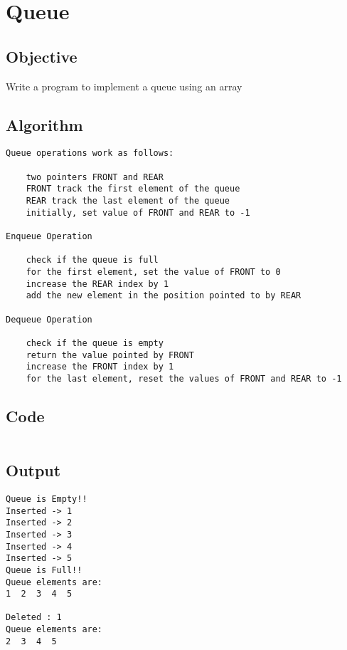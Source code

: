 \section{Queue}
\label{sec:Queue}

\subsection{Objective}
Write a program to implement a queue using an array

\subsection{Algorithm}
\begin{lstlisting}[style=mystyle]
Queue operations work as follows:

    two pointers FRONT and REAR
    FRONT track the first element of the queue
    REAR track the last element of the queue
    initially, set value of FRONT and REAR to -1

Enqueue Operation

    check if the queue is full
    for the first element, set the value of FRONT to 0
    increase the REAR index by 1
    add the new element in the position pointed to by REAR

Dequeue Operation

    check if the queue is empty
    return the value pointed by FRONT
    increase the FRONT index by 1
    for the last element, reset the values of FRONT and REAR to -1
\end{lstlisting}

\subsection{Code}
\inputminted[]{c}{../../Code/queue.c}

\subsection{Output}
\begin{lstlisting}[style=output]
Queue is Empty!!
Inserted -> 1
Inserted -> 2
Inserted -> 3
Inserted -> 4
Inserted -> 5
Queue is Full!!
Queue elements are:
1  2  3  4  5  

Deleted : 1
Queue elements are:
2  3  4  5 
\end{lstlisting}

\pagebreak
